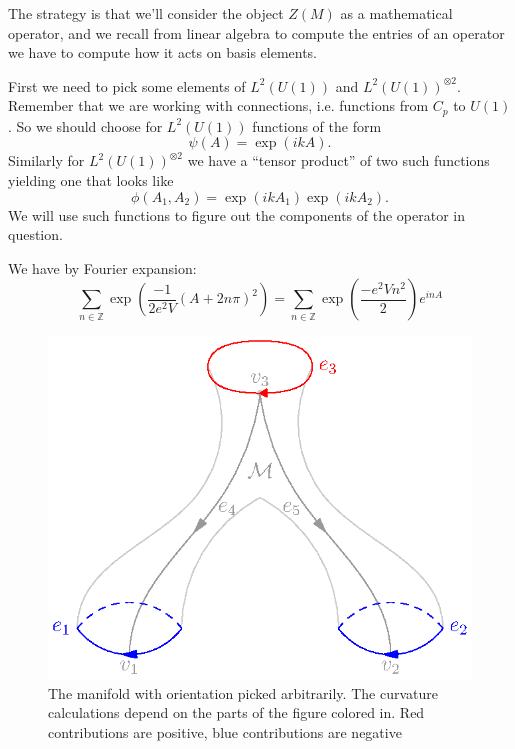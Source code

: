 \documentclass{amsart}
\numberwithin{equation}{section}
\begin{document}
The strategy is that we'll consider the object $Z(M)$ as a
mathematical operator, and we recall from linear algebra to
compute the entries of an operator we have to compute how it acts
on basis elements. 

First we need to pick some elements of $L^{2}(U(1))$ and
$L^{2}(U(1))^{\otimes 2}$. Remember that we are working
with connections, i.e. functions from $C_{p}$ to $U(1)$. So we
should choose for $L^{2}(U(1))$ functions of the form
\begin{equation}%
\psi(A) = \exp(ikA).
\end{equation}
Similarly for $L^{2}(U(1))^{\otimes 2}$ we have a
``tensor product'' of two such functions yielding one that looks
like
\begin{equation}%
\phi(A_{1},A_{2}) = \exp(ikA_{1})\exp(ikA_{2}).
\end{equation}
We will use such functions to figure out the components of the
operator in question.

\begin{prop}%
We have by Fourier expansion:
\begin{equation}%
\sum_{n\in\mathbb{Z}}\exp\left(\frac{-1}{2e^{2}V}(A+2n\pi)^{2}\right)
= \sum_{n\in\mathbb{Z}}\exp\left(\frac{-e^{2}Vn^{2}}{2}\right)e^{inA}
\end{equation}
\end{prop}

\begin{figure}[t]
\includegraphics{img/img4.eps}
\caption{The manifold with orientation picked arbitrarily. The
  curvature calculations depend on the parts of the figure
  colored in. Red contributions are positive, blue contributions
  are negative}\label{fig:img4}
\end{figure}
\end{document}
